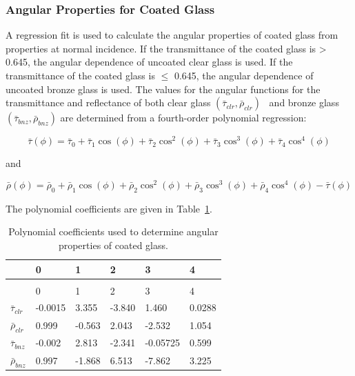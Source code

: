 \subsubsection{Angular Properties for Coated Glass}\label{angular-properties-for-coated-glass}

A regression fit is used to calculate the angular properties of coated glass from properties at normal incidence. If the transmittance of the coated glass is \textgreater{} 0.645, the angular dependence of uncoated clear glass is used. If the transmittance of the coated glass is \(\leq\) 0.645, the angular dependence of uncoated bronze glass is used. The values for the angular functions for the transmittance and reflectance of both clear glass \(({\bar \tau_{clr}},{\bar \rho_{clr}})\) ~and bronze glass \(({\bar \tau_{bnz}},{\bar \rho_{bnz}})\) are determined from a fourth-order polynomial regression:

\begin{equation}
\bar \tau (\phi ) = {\bar \tau_0} + {\bar \tau_1}\cos (\phi ) + {\bar \tau_2}{\cos ^2}(\phi ) + {\bar \tau_3}{\cos ^3}(\phi ) + {\bar \tau_4}{\cos ^4}(\phi )
\end{equation}

and

\begin{equation}
\bar \rho (\phi ) = {\bar \rho_0} + {\bar \rho_1}\cos (\phi ) + {\bar \rho_2}{\cos ^2}(\phi ) + {\bar \rho_3}{\cos ^3}(\phi ) + {\bar \rho_4}{\cos ^4}(\phi ) - \bar \tau (\phi )
\end{equation}

The polynomial coefficients are given in Table~\ref{table:polynomial-coefficients-used-to-determine}.

\begin{longtable}[c]{p{1.0in}p{1.0in}p{1.0in}p{1.0in}p{1.0in}p{1.0in}}

\caption{Polynomial coefficients used to determine angular properties of coated glass. \label{table:polynomial-coefficients-used-to-determine}} \tabularnewline
\toprule 
~ & 0 & 1 & 2 & 3 & 4 \tabularnewline
\midrule
\endfirsthead

\caption[]{Polynomial coefficients used to determine angular properties of coated glass.} \tabularnewline
\toprule 
~ & 0 & 1 & 2 & 3 & 4 \tabularnewline
\midrule
\endhead

$\bar{\tau}_{clr}$ & -0.0015 & 3.355 & -3.840 & 1.460 & 0.0288 \tabularnewline
$\bar{\rho}_{clr}$ & 0.999 & -0.563 & 2.043 & -2.532 & 1.054 \tabularnewline
$\bar{\tau}_{bnz}$ & -0.002 & 2.813 & -2.341 & -0.05725 & 0.599 \tabularnewline
$\bar{\rho}_{bnz}$ & 0.997 & -1.868 & 6.513 & -7.862 & 3.225 \tabularnewline
\bottomrule
\end{longtable}

